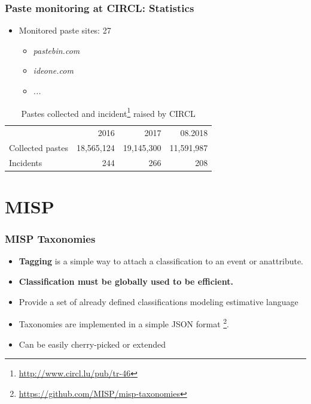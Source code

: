 \documentclass{beamer}
\begin{document}
\begin{frame}
    \frametitle{Paste monitoring at CIRCL: Statistics}
    \begin{itemize}
        \item Monitored paste sites: 27
            \begin{itemize}
                \item \textit{pastebin.com}
                \item \textit{ideone.com}
                \item \textit{...}
            \end{itemize}
    \end{itemize}
    \begin{table}[h]
		\centering
		\begin{tabular}{|lrrr|}
		    \hline
		    \rowcolor{lightgray} & 2016 & 2017 & 08.2018\\
		    Collected pastes & 18,565,124 & 19,145,300 & 11,591,987 \\
		    Incidents & 244 & 266 & 208\\
		    \hline
		\end{tabular}
		\caption{Pastes collected and incident\footnote{\url{http://www.circl.lu/pub/tr-46}} raised by CIRCL}
		\label{circlStats}
	\end{table}
\end{frame}






\section{MISP}

\begin{frame}
    \frametitle{MISP Taxonomies}
        \begin{itemize}
            \item {\bf Tagging} is a simple way to attach a classification to an event or anattribute.
            \item {\bf Classification must be globally used to be efficient.}
            \item Provide a set of already defined classifications modeling estimative language
            \item Taxonomies are implemented in a simple JSON format \footnote{\url{https://github.com/MISP/misp-taxonomies}}.
            \item Can be easily cherry-picked or extended
        \end{itemize}
\end{frame}
\end{document}
